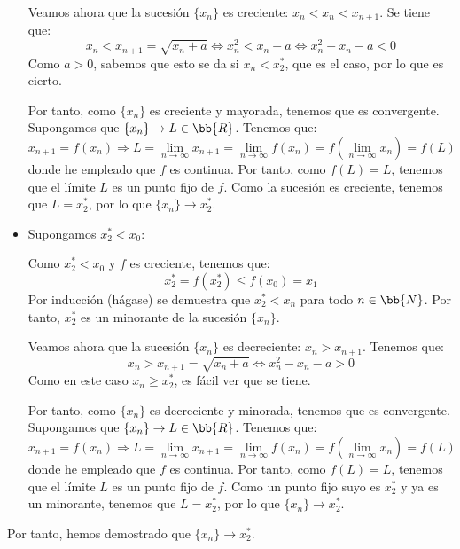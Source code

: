 \begin{ejercicio*}
\begin{itemize}
        Veamos ahora que la sucesión $\{x_n\}$ es creciente: $x_n < x_n < x_{n+1}$. Se tiene que:
        \begin{equation*}
            x_n < x_{n+1} = \sqrt{x_n +a} \Longleftrightarrow x_n^2 < x_n +a
            \Longleftrightarrow x_n^2 - x_n -a <0
        \end{equation*}
        Como $a>0$, sabemos que esto se da si $x_n<x_2^\ast$, que es el caso, por lo que es cierto.

        Por tanto, como $\{x_n\}$ es creciente y mayorada, tenemos que es convergente. Supongamos que $\{x_n\}\to L\in \bb{R}$. Tenemos que:
        \begin{equation*}
            x_{n+1} = f(x_n)
            \Longrightarrow
            L = \lim_{n\to \infty} x_{n+1} 
            = \lim_{n\to \infty}
            f(x_n) = f\left(\lim_{n\to \infty}x_n\right) = f(L)
        \end{equation*}
        donde he empleado que $f$ es continua. Por tanto, como $f(L)=L$, tenemos que el límite $L$ es un punto fijo de $f$. Como la sucesión es creciente, tenemos que $L=x_2^\ast$, por lo que $\{x_n\}\to x_2^\ast$.

        \item Supongamos $x_2^\ast<x_0$:

        Como $x_2^\ast<x_0$ y $f$ es creciente, tenemos que:
        \begin{equation*}
            x_2^\ast=f(x_2^\ast) \leq f(x_0)=x_1
        \end{equation*}
        Por inducción (hágase) se demuestra que $x_2^\ast < x_n$ para todo $n\in \bb{N}$. Por tanto, $x_2^\ast$ es un minorante de la sucesión $\{x_n\}$.
        
        Veamos ahora que la sucesión $\{x_n\}$ es decreciente: $x_n > x_{n+1}$. Tenemos que:
        \begin{equation*}
            x_n > x_{n+1} = \sqrt{x_n + a} \Longleftrightarrow x_n^2-x_n-a>0
        \end{equation*}
        Como en este caso $x_n\geq x_2^\ast$, es fácil ver que se tiene.

        Por tanto, como $\{x_n\}$ es decreciente y minorada, tenemos que es convergente. Supongamos que $\{x_n\}\to L\in \bb{R}$. Tenemos que:
        \begin{equation*}
            x_{n+1} = f(x_n)
            \Longrightarrow
            L = \lim_{n\to \infty} x_{n+1} 
            = \lim_{n\to \infty}
            f(x_n) = f\left(\lim_{n\to \infty}x_n\right) = f(L)
        \end{equation*}
        donde he empleado que $f$ es continua. Por tanto, como $f(L)=L$, tenemos que el límite $L$ es un punto fijo de $f$. Como un punto fijo suyo es $x_2^\ast$ y ya es un minorante, tenemos que $L=x_2^\ast$, por lo que $\{x_n\}\to x_2^\ast$.
    \end{itemize}

    Por tanto, hemos demostrado que $\{x_n\}\to x_2^\ast$.
\end{ejercicio*}


